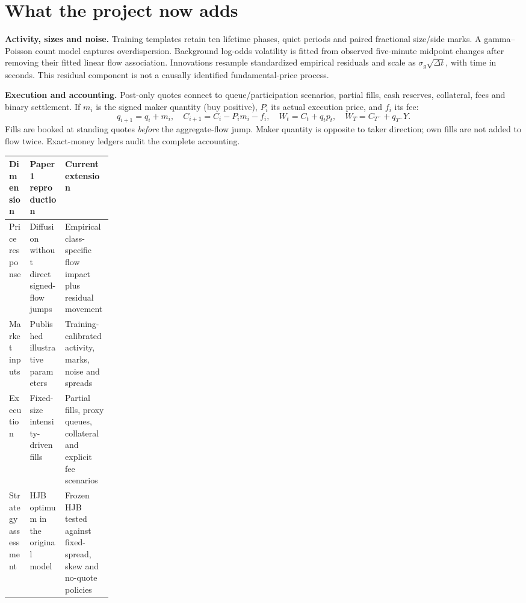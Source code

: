 \documentclass[11pt,letterpaper]{article}
\begin{document}
\section{What the project now adds}
\textbf{Activity, sizes and noise.} Training templates retain ten lifetime phases, quiet periods and paired fractional size/side marks. A gamma--Poisson count model captures overdispersion. Background log-odds volatility is fitted from observed five-minute midpoint changes after removing their fitted linear flow association. Innovations resample standardized empirical residuals and scale as $\sigma_g\sqrt{\Delta t}$, with time in seconds. This residual component is not a causally identified fundamental-price process.

\textbf{Execution and accounting.} Post-only quotes connect to queue/participation scenarios, partial fills, cash reserves, collateral, fees and binary settlement. If $m_i$ is the signed maker quantity (buy positive), $P_i$ its actual execution price, and $f_i$ its fee:
\begin{equation}
 q_{i+1}=q_i+m_i,\quad C_{i+1}=C_i-P_im_i-f_i,\quad
 W_t=C_t+q_tp_t,\quad W_T=C_{T^-}+q_{T^-}Y.
 \label{eq:accounts}
\end{equation}
Fills are booked at standing quotes \emph{before} the aggregate-flow jump. Maker quantity is opposite to taker direction; own fills are not added to flow twice. Exact-money ledgers audit the complete accounting.

\begin{center}
\small
\begin{tabularx}{\linewidth}{@{}p{0.20\linewidth}YY@{}}
\toprule
\textbf{Dimension} & \textbf{Paper 1 reproduction} & \textbf{Current extension}\\
\midrule
Price response & Diffusion without direct signed-flow jumps & Empirical class-specific flow impact plus residual movement\\
Market inputs & Published illustrative parameters & Training-calibrated activity, marks, noise and spreads\\
Execution & Fixed-size intensity-driven fills & Partial fills, proxy queues, collateral and explicit fee scenarios\\
Strategy assessment & HJB optimum in the original model & Frozen HJB tested against fixed-spread, skew and no-quote policies\\
\bottomrule
\end{tabularx}
\end{center}
\end{document}
